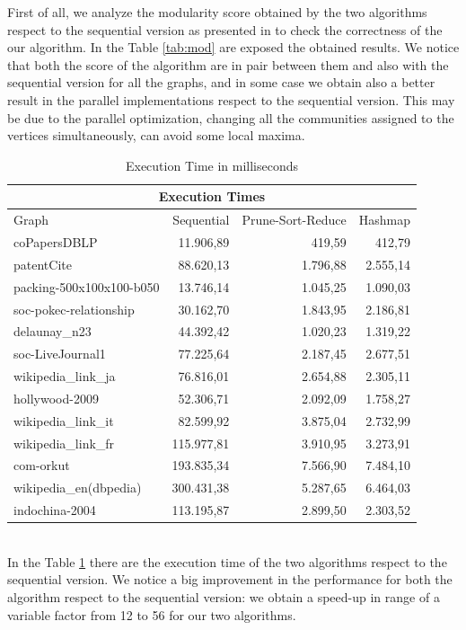 First of all, we analyze the modularity score obtained by the two algorithms respect to the sequential version as presented in \cite{Blondel_2008} to check the correctness of the our algorithm. In the Table \ref{tab:mod} are exposed the obtained results. We notice that both the score of the algorithm are in pair between them and also with the sequential version for all the graphs, and in some case we obtain also a better result in the parallel implementations respect to the sequential version. This  may be due to the parallel optimization, changing all the communities assigned to the vertices simultaneously, can avoid some local maxima.
\begin{table}
	\centering
	\begin{tabular}{ |l||r||r|r|}
		\hline
		\multicolumn{4}{|c|}{Execution Times} \\
		\hline
		Graph & Sequential & Prune-Sort-Reduce & Hashmap \\
		\hline
		coPapersDBLP 			&  11.906,89 &   419,59 &  412,79 \\
		patentCite 				&  88.620,13 & 1.796,88 & 2.555,14 \\
		packing-500x100x100-b050&  13.746,14 & 1.045,25 & 1.090,03 \\
		soc-pokec-relationship	&  30.162,70 & 1.843,95 & 2.186,81 \\ 
		delaunay\_n23 			&  44.392,42 & 1.020,23 & 1.319,22 \\
		soc-LiveJournal1 		&  77.225,64 & 2.187,45 & 2.677,51 \\
		wikipedia\_link\_ja 	&  76.816,01 & 2.654,88 & 2.305,11 \\
		hollywood-2009 			&  52.306,71 & 2.092,09 & 1.758,27 \\
		wikipedia\_link\_it 	&  82.599,92 & 3.875,04 & 2.732,99 \\
		wikipedia\_link\_fr 	& 115.977,81 & 3.910,95 & 3.273,91 \\
		com-orkut 				& 193.835,34 & 7.566,90 & 7.484,10 \\
		wikipedia\_en(dbpedia) 	& 300.431,38 & 5.287,65 & 6.464,03 \\
		indochina-2004 			& 113.195,87 & 2.899,50 & 2.303,52 \\
		\hline
	\end{tabular}
	\caption{\label{tab:execution_time}Execution Time in milliseconds}
\end{table} \\
In the Table \ref{tab:execution_time} there are the execution time of the two algorithms respect to the sequential version. We notice a big improvement in the performance for both the algorithm respect to the sequential version: we obtain a speed-up in range of a variable factor from 12 to 56 for our two algorithms. 

